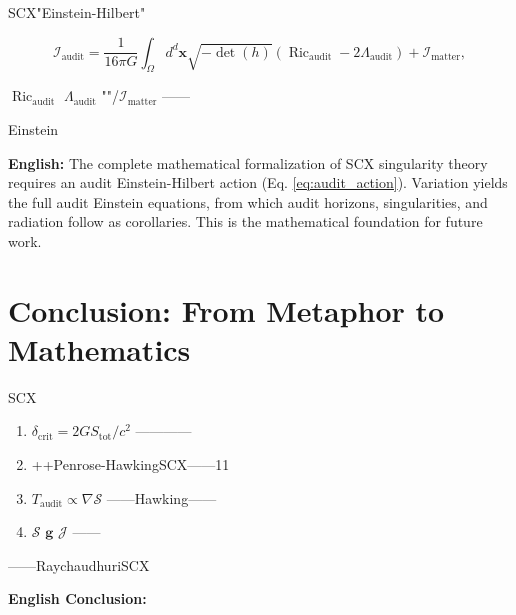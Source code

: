 \documentclass[12pt,a4paper]{article}
\theoremstyle{remark}
\newcommand{\g}{\mathbf{g}}
\newcommand{\x}{\mathbf{x}}
\DeclareMathOperator{\Ric}{Ric}
\newcommand{\cG}{G}          %
\newcommand{\cC}{c}          %
\begin{document}
\noindent
\textbf{} SCX"Einstein-Hilbert"

\begin{equation}
    \mathcal{I}_{\mathrm{audit}} = \frac{1}{16\pi\cG} \int_\Omega d^d\x \sqrt{-\det(h)} \left( \Ric_{\mathrm{audit}} - 2\Lambda_{\mathrm{audit}} \right) + \mathcal{I}_{\mathrm{matter}},
    \label{eq:audit_action}
\end{equation}

 $\Ric_{\mathrm{audit}}$ $\Lambda_{\mathrm{audit}}$ ""/$\mathcal{I}_{\mathrm{matter}}$ ——

Einstein

\vspace{4pt}
\noindent
\textbf{English:} The complete mathematical formalization of SCX singularity theory requires an audit Einstein-Hilbert action (Eq. \ref{eq:audit_action}). Variation yields the full audit Einstein equations, from which audit horizons, singularities, and radiation follow as corollaries. This is the mathematical foundation for future work.

\section{}
\section{Conclusion: From Metaphor to Mathematics}

\noindent
\textbf{}

SCX

\begin{enumerate}[label=(\arabic*)]
    \item \textbf{}  $\delta_{\mathrm{crit}} = 2\cG S_{\mathrm{tot}}/\cC^2$ ————
    
    \item \textbf{} ++Penrose-HawkingSCX——11\textbf{}
    
    \item \textbf{}  $T_{\mathrm{audit}} \propto \nabla\mathcal{S}$ ——Hawking——
    
    \item \textbf{}  $\mathcal{S}$ $\g$  $\mathcal{J}$ ——
\end{enumerate}

——RaychaudhuriSCX

\vspace{8pt}
\noindent
\textbf{English Conclusion:}
\end{document}
